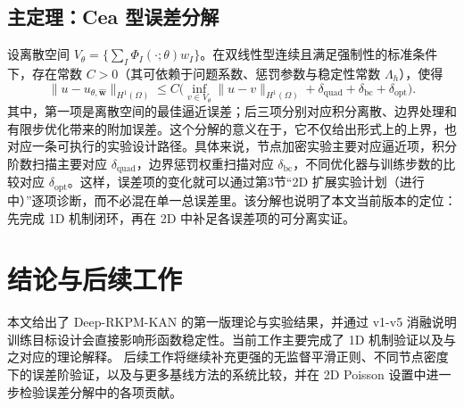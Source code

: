 ﻿\documentclass[lang=cn,a4paper]{elegantpaper}
\begin{document}
\subsection{主定理：Cea 型误差分解}
设离散空间 $V_\theta=\{\sum_I\Phi_I(\cdot;\theta)w_I\}$。在双线性型连续且满足强制性的标准条件下，存在常数 $C>0$（其可依赖于问题系数、惩罚参数与稳定性常数 $\Lambda_h$），使得
\begin{equation}
  \|u-u_{\theta,\hat{\bm{w}}}\|_{H^1(\Omega)}
  \le C\Big(\inf_{v\in V_\theta}\|u-v\|_{H^1(\Omega)}
  +\delta_{\mathrm{quad}}+\delta_{\mathrm{bc}}+\delta_{\mathrm{opt}}\Big).
\end{equation}
其中，第一项是离散空间的最佳逼近误差；后三项分别对应积分离散、边界处理和有限步优化带来的附加误差。这个分解的意义在于，它不仅给出形式上的上界，也对应一条可执行的实验设计路径。具体来说，节点加密实验主要对应逼近项，积分阶数扫描主要对应 $\delta_{\mathrm{quad}}$，边界惩罚权重扫描对应 $\delta_{\mathrm{bc}}$，不同优化器与训练步数的比较对应 $\delta_{\mathrm{opt}}$。这样，误差项的变化就可以通过第3节“2D 扩展实验计划（进行中）”逐项诊断，而不必混在单一总误差里。该分解也说明了本文当前版本的定位：先完成 1D 机制闭环，再在 2D 中补足各误差项的可分离实证。

\section{结论与后续工作}
本文给出了 Deep-RKPM-KAN 的第一版理论与实验结果，并通过 v1-v5 消融说明训练目标设计会直接影响形函数稳定性。当前工作主要完成了 1D 机制验证以及与之对应的理论解释。
后续工作将继续补充更强的无监督平滑正则、不同节点密度下的误差阶验证，以及与更多基线方法的系统比较，并在 2D Poisson 设置中进一步检验误差分解中的各项贡献。

\printbibliography[heading=bibintoc, title=\ebibname]
\end{document}
